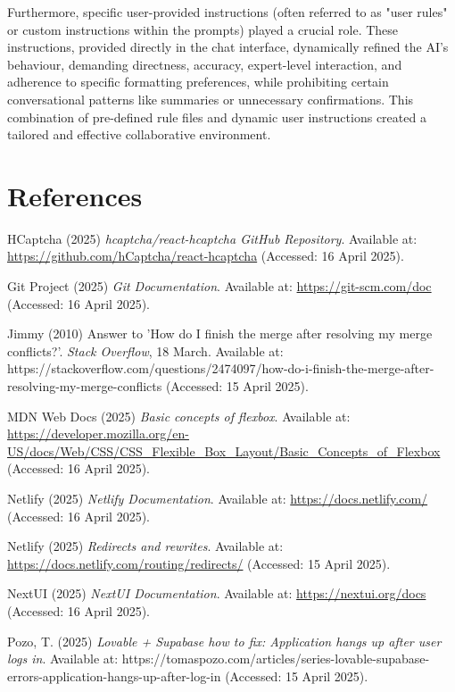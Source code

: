 \documentclass[11pt]{article} %
\begin{document}
Furthermore, specific user-provided instructions (often referred to as "user rules" or custom instructions within the prompts) played a crucial role. These instructions, provided directly in the chat interface, dynamically refined the AI's behaviour, demanding directness, accuracy, expert-level interaction, and adherence to specific formatting preferences, while prohibiting certain conversational patterns like summaries or unnecessary confirmations. This combination of pre-defined rule files and dynamic user instructions created a tailored and effective collaborative environment.

\section*{References}
\begin{thebibliography}{99} %

HCaptcha (2025) \textit{hcaptcha/react-hcaptcha GitHub Repository}. Available at: \url{https://github.com/hCaptcha/react-hcaptcha} (Accessed: 16 April 2025).

Git Project (2025) \textit{Git Documentation}. Available at: \url{https://git-scm.com/doc} (Accessed: 16 April 2025).

Jimmy (2010) Answer to 'How do I finish the merge after resolving my merge conflicts?'. \textit{Stack Overflow}, 18 March. Available at: https://stackoverflow.com/questions/2474097/how-do-i-finish-the-merge-after-resolving-my-merge-conflicts (Accessed: 15 April 2025).

MDN Web Docs (2025) \textit{Basic concepts of flexbox}. Available at: \url{https://developer.mozilla.org/en-US/docs/Web/CSS/CSS_Flexible_Box_Layout/Basic_Concepts_of_Flexbox} (Accessed: 16 April 2025).

Netlify (2025) \textit{Netlify Documentation}. Available at: \url{https://docs.netlify.com/} (Accessed: 16 April 2025).

Netlify (2025) \textit{Redirects and rewrites}. Available at: \url{https://docs.netlify.com/routing/redirects/} (Accessed: 15 April 2025).

NextUI (2025) \textit{NextUI Documentation}. Available at: \url{https://nextui.org/docs} (Accessed: 16 April 2025).

Pozo, T. (2025) \textit{Lovable + Supabase how to fix: Application hangs up after user logs in}. Available at: https://tomaspozo.com/articles/series-lovable-supabase-errors-application-hangs-up-after-log-in (Accessed: 15 April 2025).


\end{thebibliography}
\end{document}
